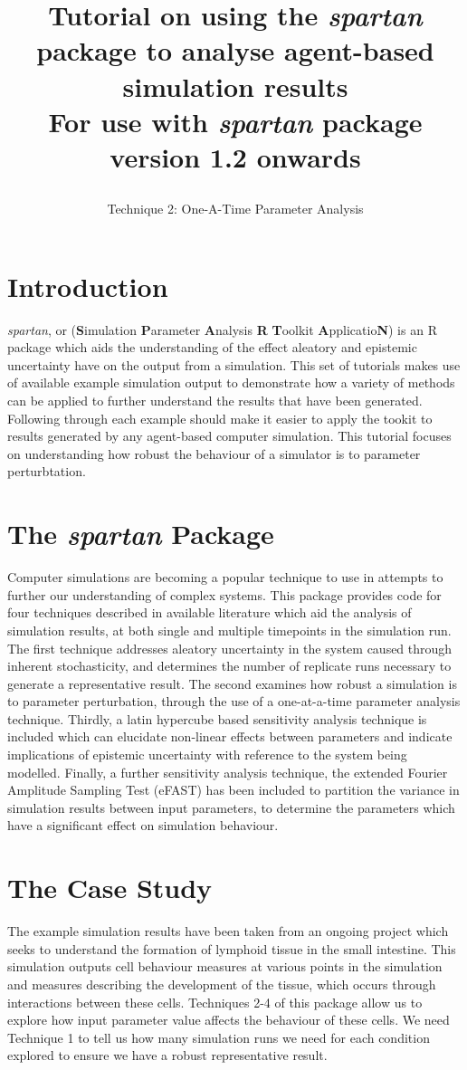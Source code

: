 \documentclass[a4paper,11pt]{article}
\title{\huge \textbf{Tutorial on using the \textit{spartan} package to analyse agent-based simulation results}\\
\Large For use with \textit{spartan} package version 1.2 onwards
\author{\Large Technique 2: One-A-Time Parameter Analysis}
\date{}
}
\begin{document}
\maketitle


\section{Introduction}
\noindent \textit{spartan}, or (\textbf{S}imulation \textbf{P}arameter \textbf{A}nalysis \textbf{R} \textbf{T}oolkit \textbf{A}pplicatio\textbf{N}) is an R package which aids the understanding of the effect aleatory and epistemic uncertainty have on the output from a simulation. This set of tutorials makes use of available example simulation output to demonstrate how a variety of methods can be applied to further understand the results that have been generated.  Following through each example should make it easier to apply the tookit to results generated by any agent-based computer simulation.  This tutorial focuses on understanding how robust the behaviour of a simulator is to parameter perturbtation.

\section{The \textit{spartan} Package}
\noindent Computer simulations are becoming a popular technique to use in attempts to further our understanding of complex systems. This package provides code for four techniques described in available literature which aid the analysis of simulation results, at both single and multiple timepoints in the simulation run. The first technique addresses aleatory uncertainty in the system caused through inherent stochasticity, and determines the number of replicate runs necessary to generate a representative result. The second examines how robust a simulation is to parameter perturbation, through the use of a one-at-a-time parameter analysis technique. Thirdly, a latin hypercube based sensitivity analysis technique is included which can elucidate non-linear effects between parameters and indicate implications of epistemic uncertainty with reference to the system being modelled. Finally, a further sensitivity analysis technique, the extended Fourier Amplitude Sampling Test (eFAST) has been included to partition the variance in simulation results between input parameters, to determine the parameters which have a significant effect on simulation behaviour.

\section{The Case Study}
\noindent The example simulation results have been taken from an ongoing project which seeks to understand the formation of lymphoid tissue in the small intestine. This simulation outputs cell behaviour measures at various points in the simulation and measures describing the development of the tissue, which occurs through interactions between these cells. Techniques 2-4 of this package allow us to explore how input parameter value affects the behaviour of these cells. We need Technique 1 to tell us how many simulation runs we need for each condition explored to ensure we have a robust representative result.
\end{document}

